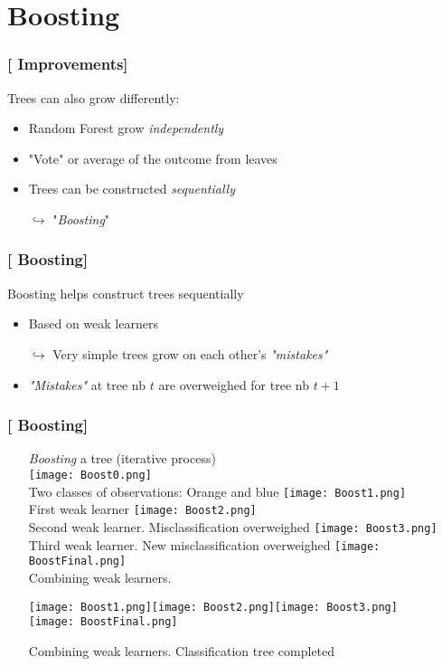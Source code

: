 \documentclass[xcolor=x11names,compress, handhouts]{beamer}
\renewcommand{\(}{\begin{columns}}
\renewcommand{\)}{\end{columns}}
\newcommand{\<}[1]{\begin{column}{#1}}
\renewcommand{\>}{\end{column}}
\begin{document}
\section{Boosting}

\begin{frame}
\frametitle{\textcolor{brique}{[ Improvements]}}
Trees can also grow differently:
\pause
 \begin{itemize}[<+->]
    \item Random Forest grow \textit{independently}
    \item "Vote" or average of the outcome from leaves
    \item Trees can be constructed \textit{sequentially}
    \item[$\hookrightarrow$] "\emph{Boosting}"
 \end{itemize}
\end{frame}

\begin{frame}
\frametitle{\textcolor{brique}{[ Boosting]}}
Boosting helps construct trees sequentially
\pause
 \begin{itemize}[<+->]
    \item Based on weak learners
    \item[$\hookrightarrow$] Very simple trees grow on each other's \textit{"mistakes"}
    \item \textit{"Mistakes"} at tree nb $t$  are overweighed for tree nb $t+1$
 \end{itemize}
\end{frame}


\begin{frame}
\frametitle{\textcolor{brique}{[ Boosting]}}
\pause
\begin{itemize}
\item[] \textit{Boosting} a tree (iterative process)\\
    {\texttt{[image: Boost0.png]} \\ }
    {Two classes of observations: Orange and blue}
    {\texttt{[image: Boost1.png]} \\ }
    {First weak learner}
    {\texttt{[image: Boost2.png]} \\ }
    {Second weak learner. Misclassification overweighed}
    {\texttt{[image: Boost3.png]} \\ }
    {Third weak learner. New misclassification overweighed}
    {\texttt{[image: BoostFinal.png]} \\ }
    {Combining weak learners.}
    { \begin{center} \texttt{[image: Boost1.png]}\texttt{[image: Boost2.png]}\texttt{[image: Boost3.png]} \\
           \texttt{[image: BoostFinal.png]} \end{center}  }
    {Combining weak learners. Classification  tree completed}
\end{itemize}
\end{frame}
\end{document}
